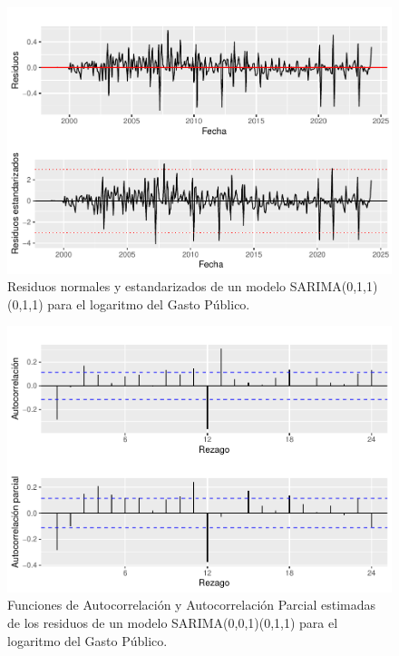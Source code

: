 \documentclass[
  12pt,
]{article}
\begin{document}
\begin{figure}[H]

{\centering \includegraphics[width=0.75\linewidth]{informe_files/figure-latex/unnamed-chunk-29-1} 

}

\caption{\label{residuos4} Residuos normales y estandarizados de un modelo SARIMA(0,1,1)(0,1,1) para el logaritmo del Gasto Público.}\label{fig:unnamed-chunk-29}
\end{figure}

\begin{figure}[H]

{\centering \includegraphics[width=0.75\linewidth]{informe_files/figure-latex/unnamed-chunk-30-1} 

}

\caption{\label{facyp_r1} Funciones de Autocorrelación y Autocorrelación Parcial estimadas de los residuos de un modelo SARIMA(0,0,1)(0,1,1) para el logaritmo del Gasto Público.}\label{fig:unnamed-chunk-30}
\end{figure}
\end{document}
